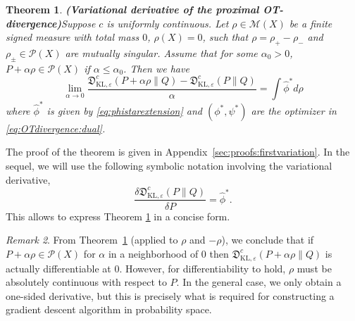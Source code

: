 \documentclass{amsart}
\newcommand{\MK}[1]{\textcolor{orange}{MK: #1}}
\newtheorem{theorem}{Theorem}[section]
\theoremstyle{definition}
\theoremstyle{remark}
\newtheorem{remark}[theorem]{Remark}
\numberwithin{equation}{section}
\begin{document}
\begin{theorem}{\bf (Variational derivative of the proximal OT-divergence)}\label{thm:first variation}  Suppose $c$ is uniformly continuous. 
Let  $\rho \in \mathcal{M}(X)$ be a finite signed measure with total mass $0$, $\rho(X)=0$, such that $\rho=\rho_+-\rho_-$ and $\rho_\pm \in \mathcal{P}(X)$ are mutually singular.  Assume that for some   $\alpha_0>0$,   $P+\alpha \rho \in \mathcal{P}(X)$ if $\alpha \le \alpha_0$. Then we have 
\begin{equation}
\lim_{\alpha \to 0} \frac{\mathfrak{D}_{\mathrm{KL},\varepsilon}^{c}(P + \alpha \rho\|Q) - \mathfrak{D}_{\mathrm{KL},\varepsilon}^{c}(P \|Q)}{\alpha}  =  \int \widehat{\phi}^{*} d\rho
\end{equation}
where $\widehat{\phi}^{*}$ is given by \eqref{eq:phistarextension}
and $(\phi^*,\psi^*)$ are the optimizer in 
\eqref{eq:OTdivergence:dual}.
\end{theorem}
The proof of the theorem is given in Appendix~\ref{sec:proofs:firstvariation}. In the sequel, we will use the following symbolic notation involving the variational derivative,  
\begin{equation}
\frac{\delta  \mathfrak{D}_{\mathrm{KL},\varepsilon}^{c}(P\|Q)}{\delta P}= \widehat{\phi}^{*}.
\end{equation}
This allows to express Theorem \ref{thm:first variation} in a concise form.
\begin{remark}
 From Theorem~\ref{thm:first variation} (applied to $\rho$ and $-\rho$), we conclude that if $P+\alpha \rho \in \mathcal{P}(X)$ for $\alpha$ in a neighborhood of $0$ then   $\mathfrak{D}_{\mathrm{KL},\varepsilon}^{c}(P + \alpha \rho\|Q)$ is actually differentiable at $0$. However, for differentiability to hold,  $\rho$ must be absolutely continuous with respect to $P$. In the general case, we only obtain a one-sided derivative, but this is precisely what is required for constructing a gradient descent algorithm in probability space. 

\end{remark}


\end{document}
